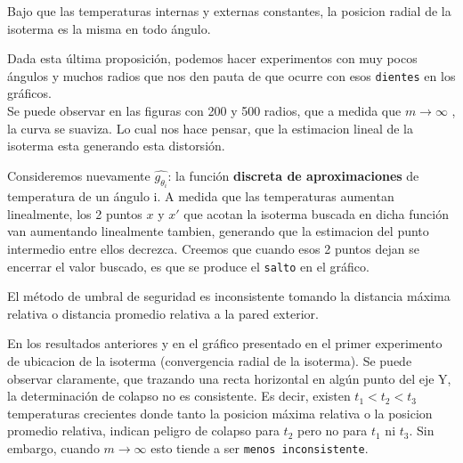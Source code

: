 \begin{proposition} 
	Bajo que las temperaturas internas y externas constantes, la posicion radial de la isoterma es la misma en todo ángulo.	
\end{proposition}

Dada esta última proposición, podemos hacer experimentos con muy pocos ángulos y muchos radios que nos den pauta de que ocurre con esos \texttt{dientes} en los gráficos. \\
Se puede observar en las figuras con 200 y 500 radios, que a medida que $m\to\infty$ , la curva se suaviza. Lo cual nos hace pensar, que la estimacion lineal de la isoterma esta generando esta distorsión.

\vspace{0.5cm}

Consideremos nuevamente $\hat{g_{\theta_i}}$: la función \textbf{discreta de aproximaciones} de temperatura de un ángulo i. A medida que las temperaturas aumentan linealmente, los 2 puntos $x$ y $x'$ que acotan la isoterma buscada en dicha función van aumentando linealmente tambien, generando que la estimacion del punto intermedio entre ellos decrezca. Creemos que cuando esos 2 puntos dejan se encerrar el valor buscado, es que se produce el \texttt{salto} en el gráfico.

\begin{proposition}
	El método de umbral de seguridad es inconsistente tomando la distancia máxima relativa o distancia promedio relativa a la pared exterior.
\end{proposition}

En los resultados anteriores y en el gráfico presentado en el primer experimento de ubicacion de la isoterma (convergencia radial de la isoterma). Se puede observar claramente, que trazando una recta horizontal en algún punto del eje Y, la determinación de colapso no es consistente. Es decir, existen $t_1 < t_2 < t_3$ temperaturas crecientes donde tanto la posicion máxima relativa o la posicion promedio relativa, indican peligro de colapso para $t_2$ pero no para $t_1$ ni $t_3$. Sin embargo, cuando $m\to\infty$ esto tiende a ser \texttt{menos inconsistente}.